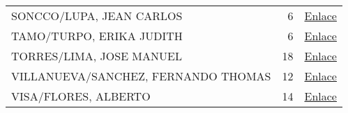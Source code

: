 \begin{table}[]
\begin{tabular}{lrl}
SONCCO/LUPA, JEAN CARLOS            & 6                       & \href{https://drive.google.com/drive/folders/1pWcei0A3TyK1bauxECR_9CvgrQHozOu2?usp=sharing}{Enlace}    \\
TAMO/TURPO, ERIKA JUDITH            & 6                       & \href{https://drive.google.com/drive/folders/1pWcei0A3TyK1bauxECR_9CvgrQHozOu2?usp=sharing}{Enlace}    \\
TORRES/LIMA, JOSE MANUEL            & 18                      & \href{https://drive.google.com/drive/folders/1pWcei0A3TyK1bauxECR_9CvgrQHozOu2?usp=sharing}{Enlace}    \\
VILLANUEVA/SANCHEZ, FERNANDO THOMAS & 12                      & \href{https://drive.google.com/drive/folders/1pWcei0A3TyK1bauxECR_9CvgrQHozOu2?usp=sharing}{Enlace}    \\
VISA/FLORES, ALBERTO                & 14                      & \href{https://drive.google.com/drive/folders/1pWcei0A3TyK1bauxECR_9CvgrQHozOu2?usp=sharing}{Enlace}     
	\end{tabular}
\end{table}
